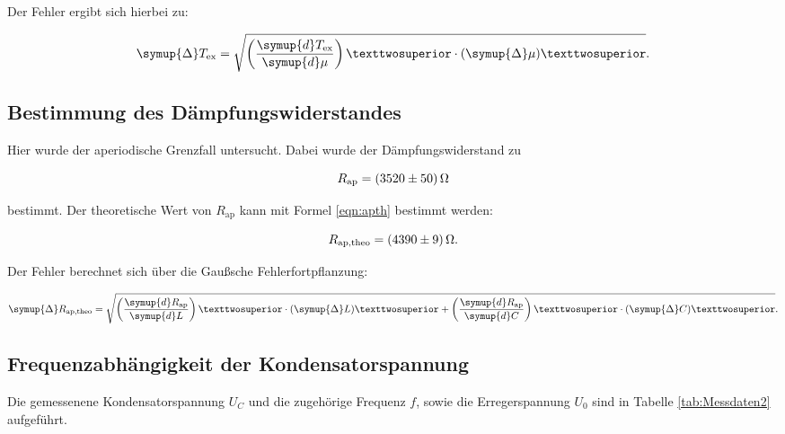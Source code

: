 Der Fehler ergibt sich hierbei zu: 

\begin{equation*}
\symup{\Delta} T_\text{ex} = \sqrt{\left(\frac{\symup{d}T_\text{ex}}{\symup{d}\mu}\right)²\cdot (\symup{\Delta}\mu)²}.
\end{equation*}

\subsection{Bestimmung des Dämpfungswiderstandes}

Hier wurde der aperiodische Grenzfall untersucht. Dabei wurde der
Dämpfungswiderstand zu 

\begin{equation*}
R_\text{ap} = \SI{3520+-50}{\ohm}
\end{equation*}

bestimmt.
Der theoretische Wert von $R_\text{ap}$ kann mit Formel \eqref{eqn:apth} bestimmt 
werden: 

\begin{equation*}
R_\text{ap,theo} = \SI{4390+-9}{\ohm}.
\end{equation*}

Der Fehler berechnet sich über die Gaußsche Fehlerfortpflanzung: 

\begin{equation*}
\symup{\Delta} R_\text{ap,theo} = \sqrt{\left(\frac{\symup{d}R_\text{ap}}{\symup{d}L}\right)²\cdot (\symup{\Delta}L)² +
\left(\frac{\symup{d}R_\text{ap}}{\symup{d}C}\right)²\cdot (\symup{\Delta}C)²}.
\end{equation*}

\subsection{Frequenzabhängigkeit der Kondensatorspannung}

Die gemessenene Kondensatorspannung $U_C$ und die zugehörige Frequenz $f$, sowie
die Erregerspannung $U_0$ sind in Tabelle \ref{tab:Messdaten2} aufgeführt. 

